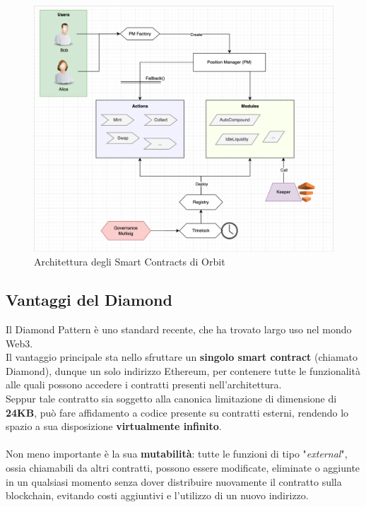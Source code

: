 \documentclass[12pt,a4paper]{report}
\begin{document}
\begin{figure}[H]
  \includegraphics[scale=0.38]{contracts_flow.png}
  \centering
  \caption{Architettura degli Smart Contracts di Orbit}
  \label{fig:contracts_flow}
\end{figure}


\subsection{Vantaggi del Diamond}

Il Diamond Pattern è uno standard recente, che ha trovato largo uso nel mondo Web3.
\\Il vantaggio principale sta nello sfruttare un \textbf{singolo smart contract} (chiamato Diamond), dunque un solo indirizzo Ethereum, per contenere tutte le funzionalità alle quali possono accedere i contratti presenti nell'architettura.
\\Seppur tale contratto sia soggetto alla canonica limitazione di dimensione di \textbf{24KB}, può fare affidamento a codice presente su contratti esterni, rendendo lo spazio a sua disposizione \textbf{virtualmente infinito}. 
\\\\Non meno importante è la sua \textbf{mutabilità}: tutte le funzioni di tipo "\textit{external}", ossia chiamabili da altri contratti, possono essere modificate, eliminate o aggiunte in un qualsiasi momento senza dover distribuire nuovamente il contratto sulla blockchain, evitando costi aggiuntivi e l'utilizzo di un nuovo indirizzo.
\end{document}
